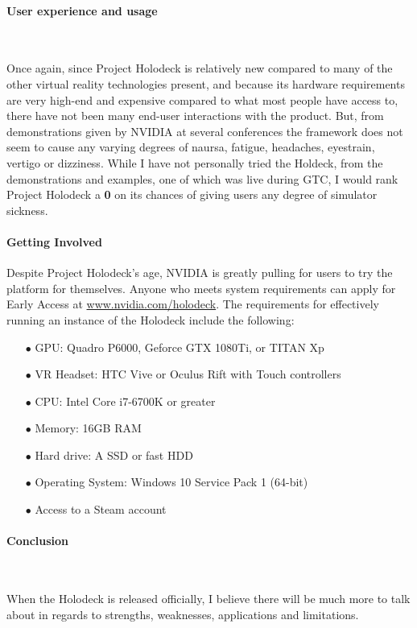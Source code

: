 \documentclass[11pt]{article}
\begin{document}
\paragraph{User experience and usage} ~ \par  
Once again, since Project Holodeck is relatively new compared to many of the other virtual reality technologies present, and because its hardware requirements are very high-end and expensive compared to what most people have access to, there have not been many end-user interactions with the product. But, from demonstrations given by NVIDIA at several conferences \cite{video1, video2, video3} the framework does not seem to cause any varying degrees of naursa, fatigue, headaches, eyestrain, vertigo or dizziness. While I have not personally tried the Holdeck, from the demonstrations and examples, one of which was live during GTC, I would rank Project Holodeck a \textbf{0} on its chances of giving users any degree of simulator sickness.

\paragraph{Getting Involved}
Despite Project Holodeck's age, NVIDIA is greatly pulling for users to try the platform for themselves. Anyone who meets system requirements can apply for Early Access at \url{www.nvidia.com/holodeck}. The requirements for effectively running an instance of the Holodeck include the following:
\begin{center}
\begin{enumerate}
\item[$\bullet$]GPU: Quadro P6000, Geforce GTX 1080Ti, or TITAN Xp
\item[$\bullet$]VR Headset: HTC Vive or Oculus Rift with Touch controllers
\item[$\bullet$]CPU: Intel Core i7-6700K or greater
\item[$\bullet$]Memory: 16GB RAM
\item[$\bullet$]Hard drive: A SSD or fast HDD
\item[$\bullet$]Operating System: Windows 10 Service Pack 1 (64-bit)
\item[$\bullet$]Access to a Steam account
\end{enumerate}
\end{center}

\paragraph{Conclusion} ~ \par 
When the Holodeck is released officially, I believe there will be much more to talk about in regards to strengths, weaknesses, applications and limitations.
\end{document}
